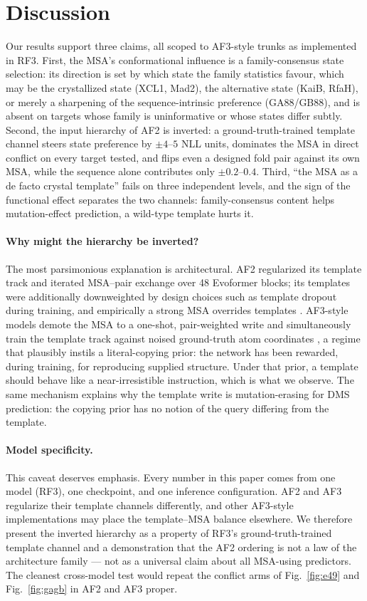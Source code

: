 \documentclass[11pt]{article}
\begin{document}
\section{Discussion}

Our results support three claims, all scoped to AF3-style trunks as
implemented in RF3. First, the MSA's conformational influence is a
family-consensus state selection: its direction is set by which state the
family statistics favour, which may be the crystallized state (XCL1, Mad2),
the alternative state (KaiB, RfaH), or merely a sharpening of the
sequence-intrinsic preference (GA88/GB88), and is absent on targets whose
family is uninformative or whose states differ subtly. Second, the input
hierarchy of AF2 is inverted: a ground-truth-trained template channel
steers state preference by $\pm 4$--$5$ NLL units, dominates the MSA in
direct conflict on every target tested, and flips even a designed fold pair
against its own MSA, while the sequence alone contributes only
$\pm 0.2$--$0.4$. Third, ``the MSA as a de facto crystal template'' fails
on three independent levels, and the sign of the functional effect separates
the two channels: family-consensus content helps mutation-effect prediction,
a wild-type template hurts it.

\paragraph{Why might the hierarchy be inverted?}
The most parsimonious explanation is architectural. AF2 regularized its
template track and iterated MSA--pair exchange over 48 Evoformer blocks; its
templates were additionally downweighted by design choices such as template
dropout during training, and empirically a strong MSA overrides templates
\cite{jumper2021,kovalevskiy2024}. AF3-style models demote the MSA to a
one-shot, pair-weighted write and simultaneously train the template track
against noised ground-truth atom coordinates \cite{abramson2024,corley2025},
a regime that plausibly instils a literal-copying prior: the network has
been rewarded, during training, for reproducing supplied structure. Under
that prior, a template should behave like a near-irresistible instruction,
which is what we observe. The same mechanism explains why the template write
is mutation-erasing for DMS prediction: the copying prior has no notion of
the query differing from the template.

\paragraph{Model specificity.}
This caveat deserves emphasis. Every number in this paper comes from one
model (RF3), one checkpoint, and one inference configuration. AF2 and AF3
regularize their template channels differently, and other AF3-style
implementations may place the template--MSA balance elsewhere. We therefore
present the inverted hierarchy as a property of RF3's ground-truth-trained
template channel and a demonstration that the AF2 ordering is not a law of
the architecture family --- not as a universal claim about all
MSA-using predictors. The cleanest cross-model test would repeat the
conflict arms of Fig.~\ref{fig:e49} and Fig.~\ref{fig:gagb} in AF2 and AF3
proper.
\end{document}
